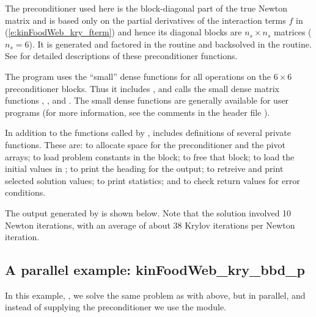 The preconditioner used here is the block-diagonal part of the true Newton
matrix and is based only on the partial derivatives of the interaction terms $f$
in (\ref{e:kinFoodWeb_kry_fterm}) and hence its  diagonal blocks are $n_s \times n_s$ matrices
($n_s = 6$).
It is generated and factored in the  routine and
backsolved in the  routine.  
See  for detailed descriptions
of these preconditioner functions.

The program  uses the ``small'' dense functions for all operations 
on the $6 \times 6$ preconditioner blocks.  
Thus it includes , and calls the small dense matrix
functions , , and .
The small dense functions are generally available for {\kinsol} user programs
(for more information, see the comments in the header file ).

In addition to the functions called by {\kinsol},  includes
definitions of several private functions.  These are: 
to allocate space for the preconditioner and the pivot arrays; 
to load problem constants in the  block;  to free
that block;  to load the initial values in ;
 to print the heading for the output;
 to retreive and print selected solution values;
 to print statistics; and 
to check return values for error conditions.

The output generated by  is shown below.  Note that the
solution involved 10 Newton iterations, with an average of about 38
Krylov iterations per Newton iteration.



\subsection{A parallel example: kinFoodWeb\_kry\_bbd\_p}\label{ss:kinFoodWeb_kry_bbd_p}

In this example, , we solve the same
problem as with  above, but in parallel, and
instead of supplying the preconditioner we use the {\kinbbdpre} module.  

